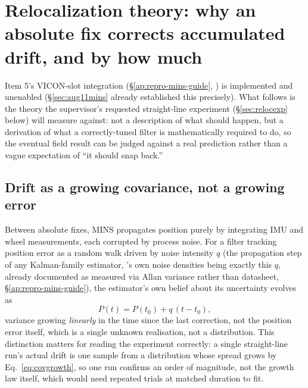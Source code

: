 \section{Relocalization theory: why an absolute fix corrects accumulated
drift, and by how much}
\label{sec:relocmath}
Item 5's VICON-slot integration (\S\ref{ap:repro-mins-guide},
) is implemented and unenabled
(\S\ref{sec:aug11mins} already established this precisely). What follows is
the theory the supervisor's requested straight-line experiment
(\S\ref{sec:relocexp} below) will measure against: not a description of what
should happen, but a derivation of what a correctly-tuned filter is
mathematically required to do, so the eventual field result can be judged
against a real prediction rather than a vague expectation of ``it should
snap back.''

\subsection{Drift as a growing covariance, not a growing error}
\label{sec:driftmodel}
Between absolute fixes, MINS propagates position purely by integrating IMU
and wheel measurements, each corrupted by process noise. For a filter
tracking position error as a random walk driven by noise intensity $q$
(the propagation step of any Kalman-family estimator, 's
own noise densities being exactly this $q$, already documented as measured
via Allan variance rather than datasheet, \S\ref{ap:repro-mins-guide}), the
estimator's own belief about its uncertainty evolves as
\begin{equation}
P(t) = P(t_0) + q\,(t - t_0),
\label{eq:covgrowth}
\end{equation}
variance growing \emph{linearly} in the time since the last correction, not
the position error itself, which is a single unknown realisation, not a
distribution. This distinction matters for reading the experiment correctly:
a single straight-line run's actual drift is one sample from a distribution
whose spread grows by Eq.~\ref{eq:covgrowth}, so one run confirms an order of
magnitude, not the growth law itself, which would need repeated trials at
matched duration to fit.

